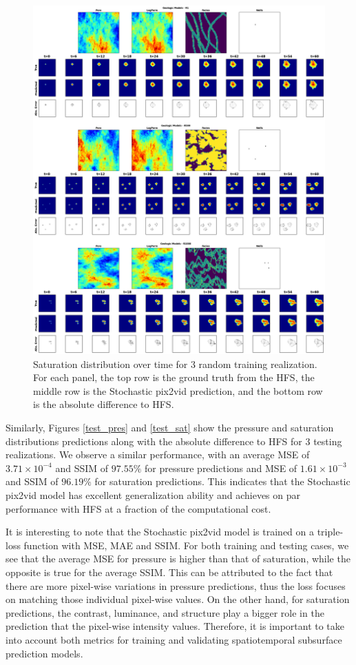 \documentclass[10pt, twoside]{article}
\begin{document}
\begin{figure}
    \centering
    \includegraphics[width=16cm]{figures/train_sat.png}
    \caption{Saturation distribution over time for 3 random training realization. For each panel, the top row is the ground truth from the HFS, the middle row is the Stochastic pix2vid prediction, and the bottom row is the absolute difference to HFS.}
    \label{train_sat}
\end{figure}

Similarly, Figures \ref{test_pres} and \ref{test_sat} show the pressure and saturation distributions predictions along with the absolute difference to HFS for 3 testing realizations. We observe a similar performance, with an average MSE of $3.71\times10^{-4}$ and SSIM of $97.55\%$ for pressure predictions and MSE of $1.61\times10^{-3}$ and SSIM of $96.19\%$ for saturation predictions. This indicates that the Stochastic pix2vid model has excellent generalization ability and achieves on par performance with HFS at a fraction of the computational cost.

It is interesting to note that the Stochastic pix2vid model is trained on a triple-loss function with MSE, MAE and SSIM. For both training and testing cases, we see that the average MSE for pressure is higher than that of saturation, while the opposite is true for the average SSIM. This can be attributed to the fact that there are more pixel-wise variations in pressure predictions, thus the loss focuses on matching those individual pixel-wise values. On the other hand, for saturation predictions, the contrast, luminance, and structure play a bigger role in the prediction that the pixel-wise intensity values. Therefore, it is important to take into account both metrics for training and validating spatiotemporal subsurface prediction models.
\end{document}
